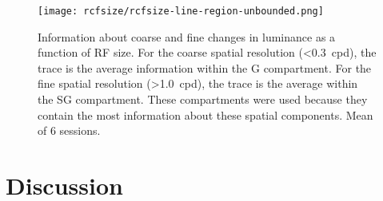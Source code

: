 

\begin{figure}[htb]
    \centering
    \texttt{[image: rcfsize/rcfsize-line-region-unbounded.png]}
    \caption{
Information about coarse and fine changes in luminance as a function of \ac{RF} size.
For the coarse spatial resolution (\SI{<0.3}{cpd}), the trace is the average information within the \ac{G} compartment.
For the fine spatial resolution (\SI{>1.0}{cpd}), the trace is the average within the \ac{SG} compartment.
These compartments were used because they contain the most information about these spatial components.
Mean of 6 sessions.
}
\label{fig:lam_rcfsize_trace}
\end{figure}


\section{Discussion}
